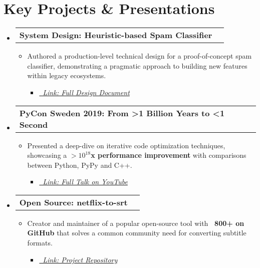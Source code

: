 \documentclass[a4paper,11pt]{article}
\makeatletter
\newcommand{\resumeItem}[1]{
  \item\small{
    {#1 \vspace{-2pt}}
  }
}
\newcommand{\resumeProjectHeading}[2]{
    \item
    \begin{tabular*}{1.001\textwidth}{l@{\extracolsep{\fill}}r}
      \small#1 & \textbf{\small #2}\\
    \end{tabular*}\vspace{-7pt}
}
\newcommand{\resumeSubHeadingListStart}{\begin{itemize}[leftmargin=0.0in, label={}]}
\newcommand{\resumeSubHeadingListEnd}{\end{itemize}}
\newcommand{\resumeItemListStart}{\begin{itemize}}
\newcommand{\resumeItemListEnd}{\end{itemize}\vspace{-5pt}}
\newcommand{\resumeProjectHeading}[2]{
    \item
    \begin{tabular*}{\textwidth}{l@{\extracolsep{\fill}}r}
        \large{#1} & \textit{#2} \\
    \end{tabular*}
}
\makeatother
\begin{document}
\vspace{0.5em plus 0.3em minus 0.2em}




\section{Key Projects \& Presentations}
\resumeSubHeadingListStart
    \resumeProjectHeading
        {\textbf{System Design: Heuristic-based Spam Classifier}}{}
        \resumeItemListStart
            \resumeItem{Authored a production-level technical design for a proof-of-concept spam classifier, demonstrating a pragmatic approach to building new features within legacy ecosystems.
                \begin{itemize}[leftmargin=1.5em, topsep=0pt, itemsep=0pt, partopsep=0pt, parsep=0pt]
                    \item[] \href{https://www.isaacbernat.com/cv#system-design}{\textit{\small \faArrowCircleRight\ Link: Full Design Document}}
                \end{itemize}
            }
        \resumeItemListEnd

    \resumeProjectHeading
        {\textbf{PyCon Sweden 2019: From \textgreater1 Billion Years to \textless1 Second}}{}
        \resumeItemListStart
            \resumeItem{Presented a deep-dive on iterative code optimization techniques, showcasing a 
            {\boldmath\textbf{$>10^{18}$x performance improvement}} with comparisons between Python, PyPy and C++.
\begin{itemize}[leftmargin=1.5em, topsep=0pt, itemsep=0pt, partopsep=0pt, parsep=0pt]
    \item[] \href{https://youtu.be/asZ0SDTKqvM}{\textit{\small \faYoutube\ Link: Full Talk on YouTube}}
\end{itemize}
            }
        \resumeItemListEnd
        
    \resumeProjectHeading
        {\textbf{Open Source: netflix-to-srt}}{}
        \resumeItemListStart
            \resumeItem{Creator and maintainer of a popular open-source tool with \textbf{\faStar\ 800+ on GitHub} that solves a common community need for converting subtitle formats.
                \begin{itemize}[leftmargin=1.5em, topsep=0pt, itemsep=0pt, partopsep=0pt, parsep=0pt]
                    \item[] \href{https://github.com/isaacbernat/netflix-to-srt/}{\textit{\small \faGithub\ Link: Project Repository}}
                \end{itemize}
            }
        \resumeItemListEnd
\resumeSubHeadingListEnd
\end{document}
